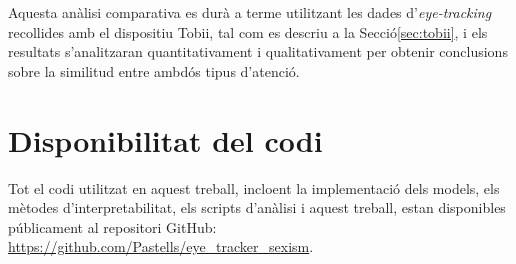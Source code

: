 Aquesta anàlisi comparativa es durà a terme utilitzant les dades d'\textit{eye-tracking} 
recollides amb el dispositiu Tobii, tal com es descriu a la Secció\ref{sec:tobii}, 
i els resultats s'analitzaran quantitativament i qualitativament per obtenir 
conclusions sobre la similitud entre ambdós tipus d'atenció.

\section{Disponibilitat del codi}

Tot el codi utilitzat en aquest treball, incloent la implementació dels models, els 
mètodes d'interpretabilitat, els scripts d'anàlisi i aquest treball, estan disponibles públicament 
al repositori GitHub: \url{https://github.com/Pastells/eye\_tracker\_sexism}. 

